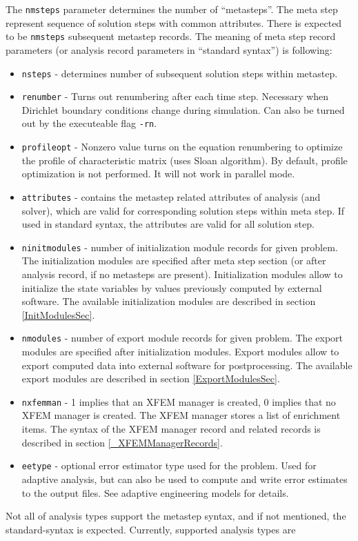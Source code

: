 \documentclass[a4paper]{report}
\newcommand{\param}[1]{\texttt{#1}} %
\begin{document}
\begin{itemize}
  The \param{nmsteps} parameter determines the number of ``metasteps''. The
meta step represent sequence of solution steps with common attributes.
There is expected to be \param{nmsteps} subsequent metastep records.
The meaning of meta step record parameters (or analysis record
parameters in ``standard syntax'') is following:
\begin{itemize}
\item \param{nsteps} - determines number of subsequent solution steps
within me\-ta\-step.
\item \param{renumber} - Turns out renumbering after each time step.
Necessary when Dirichlet boundary conditions change during simulation.
Can also be turned out by the executeable flag \texttt{-rn}.
\item \param{profileopt} - Nonzero value turns on the
equation renumbering to optimize the profile of characteristic matrix
(uses Sloan algorithm). By default, profile optimization is not
performed. It will not work in parallel mode.
\item \param{attributes} - contains the metastep related attributes of
analysis (and solver), which are valid for corresponding solution
steps within meta step. If used in standard syntax, the attributes are
valid for all solution step.
\item \param{ninitmodules} - number of initialization module records for given
problem. The initialization modules are specified after meta step section (or
after analysis record, if no metasteps are present). Initialization modules
allow to initialize the state variables by values previously computed by 
external software. The available initialization modules are described in section
\ref{InitModulesSec}.
\item \param{nmodules} - number of export module records for given
problem. The export modules are specified after initialization modules. Export modules
allow to export computed data into external software for
postprocessing. The available export modules are described in section
\ref{ExportModulesSec}.
\item \param{nxfemman} - 1 implies that an XFEM manager is created, 0 implies
that no XFEM manager is created. The XFEM manager stores a list of enrichment
items. The syntax of the XFEM manager record and related records is described in
section \ref{_XFEMManagerRecords}.
\item \param{eetype} - optional error estimator type used for the problem.
Used for adaptive analysis, but can also be used to compute and write error estimates to the output files. See adaptive engineering models for details.
\end{itemize}

\end{itemize}
Not all of analysis types support the metastep syntax, and if
not mentioned, the standard-syntax is expected.
Currently, supported analysis types are
\end{document}
